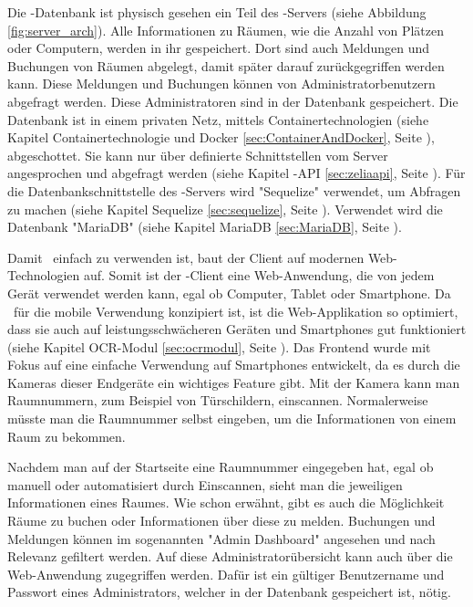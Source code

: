 Die \ZELIA-Datenbank ist physisch gesehen ein Teil des \ZELIA-Servers (siehe Abbildung \ref{fig:server_arch}). Alle Informationen zu Räumen, wie die Anzahl von Plätzen oder Computern, werden in ihr gespeichert. Dort sind auch Meldungen und Buchungen von Räumen abgelegt, damit später darauf zurückgegriffen werden kann. Diese Meldungen und Buchungen können von Administratorbenutzern abgefragt werden. Diese Administratoren sind in der Datenbank gespeichert. Die Datenbank ist in einem privaten Netz, mittels Containertechnologien (siehe Kapitel Containertechnologie und Docker \ref{sec:ContainerAndDocker}, Seite \pageref{sec:ContainerAndDocker}), abgeschottet. Sie kann nur über definierte Schnittstellen vom Server angesprochen und abgefragt werden (siehe Kapitel \ZELIA-API \ref{sec:zeliaapi}, Seite \pageref{sec:zeliaapi}). Für die Datenbankschnittstelle des \ZELIA-Servers wird "Sequelize" verwendet, um Abfragen zu machen (siehe Kapitel Sequelize \ref{sec:sequelize}, Seite \pageref{sec:sequelize}). Verwendet wird die Datenbank "MariaDB" (siehe Kapitel MariaDB \ref{sec:MariaDB}, Seite \pageref{sec:sequelize}).



Damit \ZELIA\ einfach zu verwenden ist, baut der Client auf modernen Web-\-Techno\-logien auf. Somit ist der \ZELIA-Client eine Web-Anwendung,  die von jedem Gerät verwendet werden kann, egal ob Computer, Tablet oder Smartphone. Da \ZELIA\ für die mobile Verwendung konzipiert ist, ist die Web-Applikation so optimiert, dass sie auch auf leistungsschwächeren Geräten und Smartphones gut funktioniert (siehe Kapitel OCR-Modul \ref{sec:ocrmodul}, Seite \pageref{sec:ocrmodul}). Das Frontend wurde mit Fokus auf eine einfache Verwendung auf Smartphones entwickelt, da es durch die Kameras dieser Endgeräte ein wichtiges Feature gibt. Mit der Kamera kann man Raumnummern, zum Beispiel von Türschildern, einscannen. Normalerweise müsste man die Raumnummer selbst eingeben, um die Informationen von einem Raum zu bekommen. 

Nachdem man auf der Startseite eine Raumnummer eingegeben hat, egal ob manuell oder automatisiert durch Einscannen, sieht man die jeweiligen Informationen eines Raumes. Wie schon erwähnt, gibt es auch die Möglichkeit Räume zu buchen oder Informationen über diese zu melden. Buchungen und Meldungen können im sogenannten "Admin Dashboard" angesehen und nach Relevanz gefiltert werden. Auf diese Administratorübersicht kann auch über die Web-Anwendung zugegriffen werden. Dafür ist ein gültiger Benutzername und Passwort eines Administrators, welcher in der Datenbank gespeichert ist, nötig.

